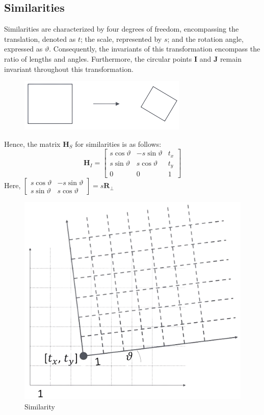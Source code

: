 \subsection{Similarities}
Similarities are characterized by four degrees of freedom, encompassing the translation, denoted as $t$; the scale, represented by $s$; and the rotation angle, expressed as $\vartheta$.
Consequently, the invariants of this transformation encompass the ratio of lengths and angles.
Furthermore, the circular points $\mathbf{I}$ and $\mathbf{J}$ remain invariant throughout this transformation.
\begin{figure}[H]
    \centering
    \includegraphics[width=0.2\linewidth]{images/similarity.png}
\end{figure}
Hence, the matrix $\mathbf{H}_S$ for similarities is as follows:
\[\mathbf{H}_I=
\begin{bmatrix}
    s\cos \vartheta & -s\sin \vartheta & t_x \\
    s\sin \vartheta & s\cos \vartheta & t_y \\
    0 & 0 & 1
\end{bmatrix}\]
Here, $
\begin{bmatrix}
    s\cos \vartheta & -s\sin \vartheta \\
    s\sin \vartheta & s\cos \vartheta
\end{bmatrix}
=s\mathbf{R}_{\perp}$
\begin{figure}[H]
    \centering
    \includegraphics[width=0.25\linewidth]{images/isometry1.png}
    \caption{Similarity}
\end{figure}

